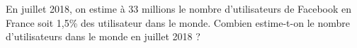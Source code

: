 
En juillet 2018, on estime à 33 millions le nombre d'utilisateurs de Facebook en France soit 1,5\% des utilisateur dans le monde. Combien estime-t-on le nombre d'utilisateurs dans le monde en juillet 2018 ?